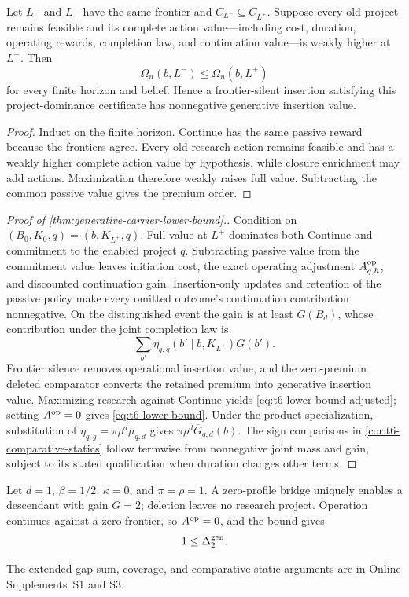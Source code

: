 \begin{proposition}
\label{prop:premium-monotonicity}
Let \(L^-\) and \(L^+\) have the same frontier and
\(C_{L^-}\subseteq C_{L^+}\).  Suppose every old project remains feasible and
its complete action value---including cost, duration, operating rewards,
completion law, and continuation value---is weakly higher at \(L^+\).  Then
\[
  \Omega_n(b,L^-)\le\Omega_n(b,L^+)
\]
for every finite horizon and belief.  Hence a frontier-silent insertion
satisfying this project-dominance certificate has nonnegative generative
insertion value.
\end{proposition}

\begin{proof}
Induct on the finite horizon.  Continue has the same passive reward because
the frontiers agree.  Every old research action remains feasible and has a
weakly higher complete action value by hypothesis, while closure enrichment
may add actions.  Maximization therefore weakly raises full value.  Subtracting
the common passive value gives the premium order.
\end{proof}

\begin{proof}[Proof of \cref{thm:generative-carrier-lower-bound}.]
Condition on \((B_0,K_0,q)=(b,K_{L^+},q)\).  Full value at \(L^+\) dominates
both Continue and commitment to the enabled project \(q\).  Subtracting
passive value from the commitment value leaves initiation cost, the exact
operating adjustment \(A^{\mathrm{op}}_{q,h}\), and discounted continuation gain.
Insertion-only updates and retention of the passive policy make every omitted
outcome's continuation contribution nonnegative.  On the distinguished event
the gain is at least \(G(B_d)\), whose contribution under the joint completion
law is
\[
 \sum_{b'}\eta_{q,g}(b'\mid b,K_{L^+})G(b').
\]
Frontier silence removes operational insertion value, and the zero-premium
deleted comparator converts the retained premium into generative insertion
value.  Maximizing research against Continue yields
\eqref{eq:t6-lower-bound-adjusted}; setting \(A^{\mathrm{op}}=0\) gives
\eqref{eq:t6-lower-bound}.  Under the product specialization, substitution of
\(\eta_{q,g}=\pi\rho^d\mu_{q,d}\) gives
\(\pi\rho^d\overline G_{q,d}(b)\).  The sign comparisons in
\cref{cor:t6-comparative-statics} follow termwise from nonnegative joint mass
and gain, subject to its stated qualification when duration changes other
terms.
\end{proof}

\begin{example}
\label{ex:t6-exact-carrier}
Let \(d=1\), \(\beta=1/2\), \(\kappa=0\), and \(\pi=\rho=1\).  A zero-profile
bridge uniquely enables a descendant with gain \(G=2\); deletion leaves no
research project.  Operation continues against a zero frontier, so
\(A^{\mathrm{op}}=0\), and the bound gives
\[
  1\le\Delta^{\mathrm{gen}}_2.
\]
\end{example}

The extended gap-sum, coverage, and comparative-static arguments are in
Online Supplements~S1 and S3.
